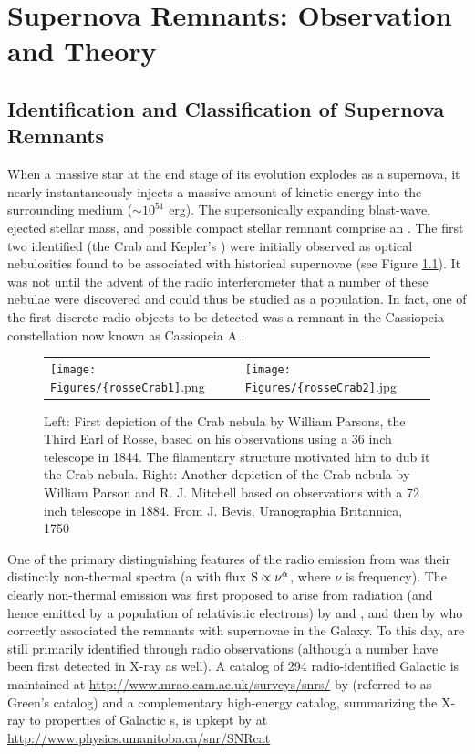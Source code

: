 \chapter{Supernova Remnants: Observation and Theory}
\label{chap:Rems}

\section{Identification and Classification of Supernova Remnants}\label{Rems:intro}
When a massive star at the end stage of its evolution explodes as a supernova, it nearly instantaneously injects a massive amount of kinetic energy into the surrounding medium ($\sim 10^{51}$ erg). The supersonically expanding blast-wave, ejected stellar mass, and possible compact stellar remnant comprise an \snr{}. The first two identified \snrs{} (the Crab and Kepler's \snr{}) were initially observed as optical nebulosities found to be associated with historical supernovae (see Figure \ref{fig:Crab}). It was not until the advent of the radio interferometer that a number of these nebulae were discovered and could thus be studied as a population.  In fact, one of the first discrete radio objects to be detected was a remnant in the Cassiopeia constellation now known as Cassiopeia A \citep{Ryle48}.

\begin{figure}[h!]
	\begin{center}
		\begin{tabular}{ll}
			\texttt{[image: Figures/\{rosseCrab1]}.png} &
			\texttt{[image: Figures/\{rosseCrab2]}.jpg} \\
		\end{tabular}
	\end{center}
	\caption[Historical Crab nebula drawings]{
		\label{fig:Crab}{Left: First depiction of the Crab nebula by William Parsons, the Third Earl of Rosse,  based on his observations using a 36 inch telescope in 1844. The filamentary structure motivated him to dub it the Crab nebula. Right: Another depiction of the Crab nebula  by William Parson and R. J. Mitchell based on observations with a 72 inch telescope in 1884. From J. Bevis, Uranographia Britannica, 1750}
	}
\end{figure}
One of the primary distinguishing features of the radio emission from \snrs{} was their distinctly non-thermal spectra (a \pl{} with flux  ${\rm S \propto \nu^\alpha}$, where $\nu$ is frequency). The clearly non-thermal emission was first proposed to arise from \sync{} radiation (and hence emitted by a population of relativistic electrons) by \cite{Kiepenheuer50} and \cite{Alfven50}, and then by \cite{Shklovskii53} who correctly associated the remnants with supernovae in the Galaxy. To this day, \snrs{} are still primarily identified through radio observations (although a number have been first detected in X-ray as well). A catalog of 294 radio-identified Galactic \snrs{} is maintained at \url{http://www.mrao.cam.ac.uk/surveys/snrs/} by \cite{Green14} (referred to as Green's catalog) and a complementary high-energy catalog, summarizing the X-ray to \gam{} properties of Galactic \snr{}s, is upkept by \cite{Ferrand12} at \url{http://www.physics.umanitoba.ca/snr/SNRcat}

